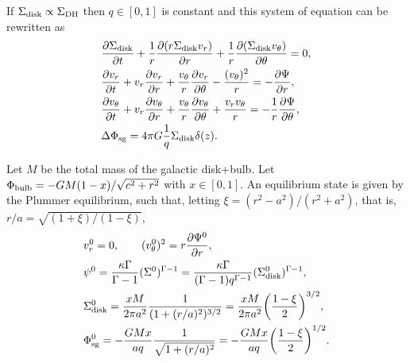 \documentclass[11pt]{article}
\newcommand{\vr}{v_{r}}
\newcommand{\vt}{v_{\theta}}
\newcommand{\Sigmad}{\Sigma_{\rm{disk}}}
\newcommand{\Phib}{\Phi_{\rm{bulb}}}
\newcommand{\Phisg}{\Phi_{\rm{sg}}}
\begin{document}
If $\Sigma_{\rm{disk}}\propto\Sigma_{\rm{DH}}$ then $q\in [0,1]$ is constant and this system of equation can be rewritten as 
\begin{align}
&\frac{\partial \Sigmad}{\partial t} + \frac{1}{r} \frac{\partial(r\Sigmad \vr)}{\partial r} + \frac{1}{r} \frac{\partial(\Sigmad \vt)}{\partial \theta} = 0 ,\\
&\frac{\partial \vr}{\partial t} + \vr \frac{\partial \vr}{\partial r} + \frac{\vt}{r} \frac{\partial \vr}{\partial \theta} - \frac{(\vt)^2}{r} = -\frac{\partial \Psi}{\partial r} ,\\
&\frac{\partial \vt}{\partial t} + \vr \frac{\partial \vt}{\partial r} + \frac{\vt}{r} \frac{\partial \vt}{\partial \theta} + \frac{\vr\vt}{r} = -\frac{1}{r}\frac{\partial \Psi}{\partial \theta} ,\\
& \Delta \Phisg = 4\pi G \frac{1}{q} \Sigmad \delta (z).
\end{align}

Let $M$ be the total mass of the galactic disk+bulb. Let $\Phib = - G M (1-x)/\sqrt{c^2+r^2}$ with $x\in [0,1]$. An equilibrium state is given by the Plummer equilibrium, such that,  letting $\xi = (r^2-a^2)/(r^2+a^2) $, that is, $r/a=\sqrt{(1+\xi)/(1-\xi)}$,
\begin{align*}
&\vr^0 = 0,\quad \quad (\vt^0)^2 = r \frac{\partial \Psi^0}{\partial r}, \\
& \psi^0 = \frac{\kappa \Gamma}{\Gamma-1} (\Sigma^0)^{\Gamma-1} = \frac{\kappa \Gamma}{(\Gamma-1)q^{\Gamma-1}} (\Sigmad^0)^{\Gamma-1},\\
& \Sigmad^0 = \frac{xM}{2\pi a^2} \frac{1}{(1+(r/a)^2)^{3/2}} =\frac{xM}{2\pi a^2}   \bigg(\frac{1-\xi}{2}\bigg)^{3/2},\\
& \Phisg^0 = -\frac{G M x}{a q} \frac{1}{\sqrt{1+(r/a)^2}} = -\frac{G M x}{a q} \bigg(\frac{1-\xi}{2}\bigg)^{1/2} .
\end{align*}
\end{document}
